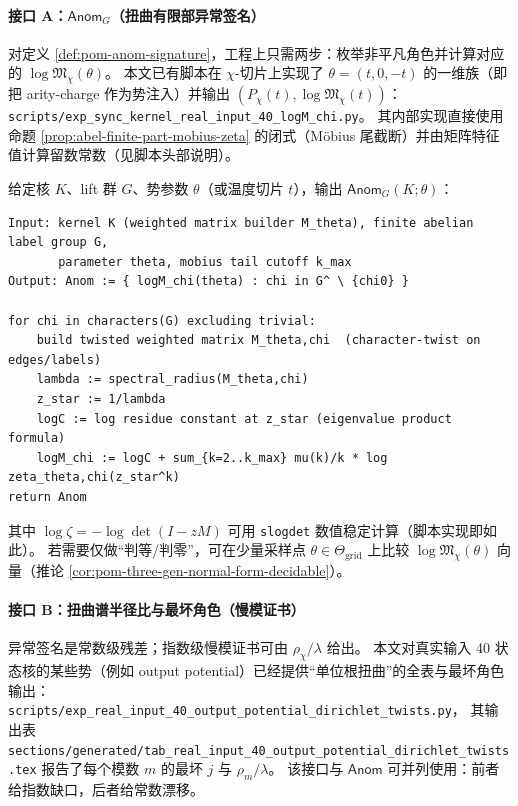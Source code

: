 \paragraph{接口 A：\texorpdfstring{$\mathsf{Anom}_G$}{Anom}（扭曲有限部异常签名）}
对定义 \ref{def:pom-anom-signature}，工程上只需两步：枚举非平凡角色并计算对应的 \(\log\mathfrak{M}_\chi(\theta)\)。
本文已有脚本在 \(\chi\)-切片上实现了 \(\theta=(t,0,-t)\) 的一维族（即把 arity-charge 作为势注入）并输出 \((P_\chi(t),\log\mathfrak{M}_\chi(t))\)：
\texttt{scripts/exp\_sync\_kernel\_real\_input\_40\_logM\_chi.py}。
其内部实现直接使用命题 \ref{prop:abel-finite-part-mobius-zeta} 的闭式（Möbius 尾截断）并由矩阵特征值计算留数常数（见脚本头部说明）。

\begin{remark}\label{rem:pom-anom-pseudocode}
给定核 \(K\)、lift 群 \(G\)、势参数 \(\theta\)（或温度切片 \(t\)），输出 \(\mathsf{Anom}_G(K;\theta)\)：
\begin{verbatim}
Input: kernel K (weighted matrix builder M_theta), finite abelian label group G,
       parameter theta, mobius tail cutoff k_max
Output: Anom := { logM_chi(theta) : chi in G^ \ {chi0} }

for chi in characters(G) excluding trivial:
    build twisted weighted matrix M_theta,chi  (character-twist on edges/labels)
    lambda := spectral_radius(M_theta,chi)
    z_star := 1/lambda
    logC := log residue constant at z_star (eigenvalue product formula)
    logM_chi := logC + sum_{k=2..k_max} mu(k)/k * log zeta_theta,chi(z_star^k)
return Anom
\end{verbatim}
其中 \(\log\zeta=-\log\det(I-zM)\) 可用 \texttt{slogdet} 数值稳定计算（脚本实现即如此）。
若需要仅做“判等/判零”，可在少量采样点 \(\theta\in\Theta_{\mathrm{grid}}\) 上比较 \(\log\mathfrak{M}_\chi(\theta)\) 向量（推论 \ref{cor:pom-three-gen-normal-form-decidable}）。
\end{remark}

\paragraph{接口 B：扭曲谱半径比与最坏角色（慢模证书）}
异常签名是常数级残差；指数级慢模证书可由 \(\rho_\chi/\lambda\) 给出。
本文对真实输入 40 状态核的某些势（例如 output potential）已经提供“单位根扭曲”的全表与最坏角色输出：
\texttt{scripts/exp\_real\_input\_40\_output\_potential\_dirichlet\_twists.py}，
其输出表 \texttt{sections/generated/tab\_real\_input\_40\_output\_potential\_dirichlet\_twists.tex}
报告了每个模数 \(m\) 的最坏 \(j\) 与 \(\rho_m/\lambda\)。
该接口与 \(\mathsf{Anom}\) 可并列使用：前者给指数缺口，后者给常数漂移。

